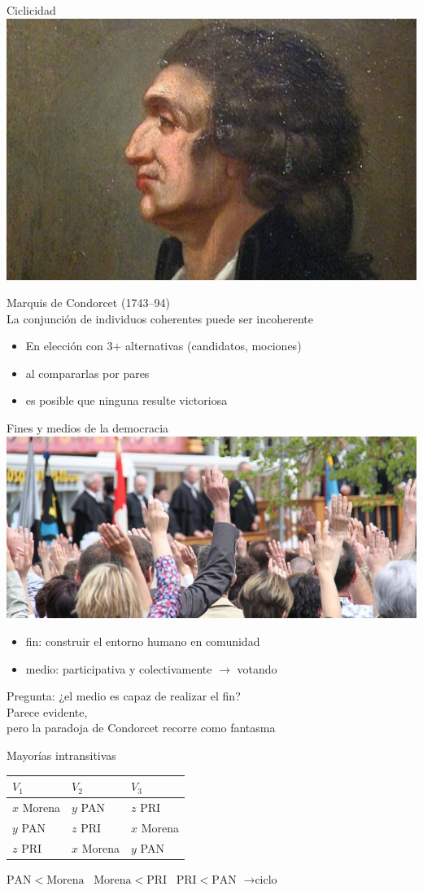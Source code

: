 \documentclass[bigger]{beamer}
\begin{document}
\begin{frame}[label={sec:orgac81cb3}]{Ciclicidad}
\centering
\includegraphics[width=.4\textwidth]{./pics/condorcet.jpg} 

Marquis de Condorcet (1743--94) \\[0pt]
La conjunción de individuos coherentes puede ser incoherente
\bigskip
\begin{itemize}
\item En elección con 3+ alternativas (candidatos, mociones)
\item al compararlas por pares
\item es posible que \alert{ninguna} resulte victoriosa
\end{itemize}
\end{frame}
\begin{frame}[label={sec:orgc79e8a5}]{Fines y medios de la democracia}
\centering
\includegraphics[width=.6\textwidth]{./pics/2014-02-10_swiss_people_vote.jpg} 
\bigskip
\begin{itemize}
\item fin: construir el entorno humano en comunidad
\end{itemize}

\begin{itemize}
\item medio: participativa y colectivamente  \(\rightarrow\) \alert{votando}
\end{itemize}
\bigskip \pause
Pregunta: ¿el medio es capaz de realizar el fin? \\[0pt]
\bigskip
Parece evidente, \\[0pt]
pero la paradoja de Condorcet recorre como fantasma
\end{frame}
\begin{frame}[label={sec:org756b4b6}]{Mayorías intransitivas}
\begin{center}
\begin{tabular}{lll}
\(V_1\) & \(V_2\) & \(V_3\)\\[0pt]
\hline
\(x\) Morena & \(y\) PAN & \(z\) PRI\\[0pt]
\(y\) PAN & \(z\) PRI & \(x\) Morena\\[0pt]
\(z\) PRI & \(x\) Morena & \(y\) PAN\\[0pt]
\end{tabular}
\end{center}
\bigskip \pause
\(\text{PAN} < \text{Morena} \;\;\; \text{Morena} < \text{PRI} \;\;\; \text{PRI} < \text{PAN}\)
\(\rightarrow \text{ciclo}\) 
\end{frame}
\end{document}

